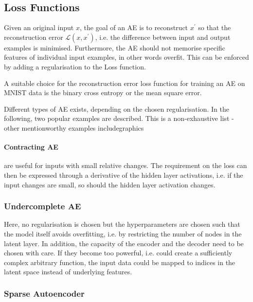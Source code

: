 \subsection{Loss Functions}
Given an original input $x$, the goal of an AE is to reconstruct $x^\prime$ so
that the reconstruction error $\mathcal{L}(x,x^\prime)$, i.e. the difference
between input and output examples is minimised. Furthermore, the AE should not
memorise specific features of individual input examples, in other words overfit.
This can be enforced by adding a regularisation to the Loss function.

A suitable choice for the reconstruction error loss function for training an AE
on MNIST data is the binary cross entropy or the mean square error. 

Different types of AE exists, depending on the chosen regularisation. In the
following, two popular examples are described. This is a non-exhaustive list -
other mentionworthy examples includegraphics

\paragraph{Contracting AE} are useful for inputs with small relative changes.
The requirement on the loss can then be expressed through a derivative of the
hidden layer activations, i.e. if the input changes are small, so should the
hidden layer activation changes.

\subsubsection{Undercomplete AE}
Here, no regularisation is chosen but the hyperparameters are chosen such that
the model itself avoids overfitting, i.e. by restricting the number of nodes in
the latent layer. In addition, the capacity of the encoder and the decoder need
to be chosen with care. If they become too powerful, i.e. could create a
sufficiently complex arbitrary function, the input data could be mapped to
indices in the latent space instead of underlying features.

\subsubsection{Sparse Autoencoder}

